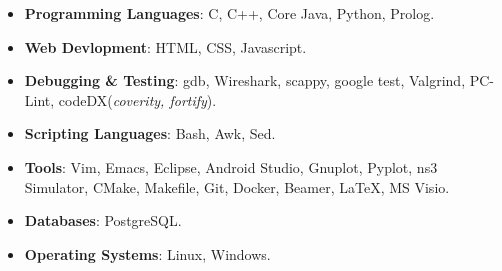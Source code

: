 \begin{multicols}{2}
\begin{itemize}
  \item \textbf{Programming Languages}: C, C++, Core Java, Python, Prolog.\\[-0.6cm]
  \item \textbf{Web Devlopment}: HTML, CSS, Javascript.\\[-0.6cm]
  \item \textbf{Debugging \& Testing}: gdb, Wireshark, scappy, google test, Valgrind, PC-Lint, codeDX(\textit{coverity, fortify}).
\end{itemize}
\columnbreak
\begin{itemize}
 \item \textbf{Scripting Languages}: Bash, Awk, Sed.\\[-0.6cm]
  \item \textbf{Tools}: Vim, Emacs, Eclipse, Android Studio, Gnuplot, Pyplot, ns3 Simulator, CMake, Makefile, Git, Docker, Beamer, \LaTeX, MS Visio.\\[-0.6cm]
    \item \textbf{Databases}: PostgreSQL. \\[-0.6cm]
  \item \textbf{Operating Systems}: Linux, Windows.\\[-0.6cm]
\end{itemize}
\end{multicols}

